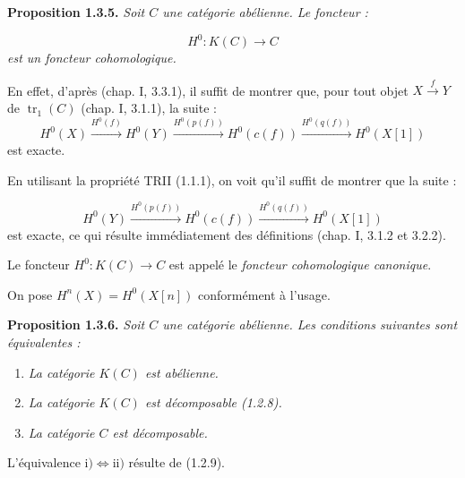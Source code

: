 \clearpage
{}%
\begingroup
\small
\setlength{\emergencystretch}{1.5em}%
\setlength{\abovedisplayskip}{4pt plus 2pt minus 2pt}%
\setlength{\belowdisplayskip}{4pt plus 2pt minus 2pt}%

\noindent\textbf{Proposition 1.3.5.}\quad
\emph{Soit $C$ une catégorie abélienne. Le foncteur :}

\[
  H^0\colon K(C)\longrightarrow C
\]
\noindent\emph{est un foncteur cohomologique.}

En effet, d'après (chap. I, 3.3.1), il suffit de montrer que, pour tout objet
$X\xrightarrow{f}Y$ de $\operatorname{tr}_1(C)$ (chap. I, 3.1.1), la suite :
\[
  H^0(X)\xrightarrow{H^0(f)}H^0(Y)
  \xrightarrow{H^0(p(f))}H^0(c(f))
  \xrightarrow{H^0(q(f))}H^0(X[1])
\]
\noindent est exacte.

En utilisant la propriété TRII (1.1.1), on voit qu'il suffit de montrer que
la suite :

\[
  H^0(Y)\xrightarrow{H^0(p(f))}H^0(c(f))
  \xrightarrow{H^0(q(f))}H^0(X[1])
\]
\noindent est exacte, ce qui résulte immédiatement des définitions
(chap. I, 3.1.2 et 3.2.2).

Le foncteur $H^0\colon K(C)\longrightarrow C$ est appelé le
\emph{foncteur cohomologique canonique}.

On pose $H^n(X)=H^0(X[n])$ conformément à l'usage.

\medskip
\noindent\textbf{Proposition 1.3.6.}\quad
\emph{Soit $C$ une catégorie abélienne. Les conditions suivantes sont
équivalentes :}

\begin{enumerate}
\renewcommand{\labelenumi}{\roman{enumi})}
\item \emph{La catégorie $K(C)$ est abélienne.}
\item \emph{La catégorie $K(C)$ est décomposable (1.2.8).}
\item \emph{La catégorie $C$ est décomposable.}
\end{enumerate}

L'équivalence
$\mathrm{i)}\Longleftrightarrow\mathrm{ii)}$ résulte de (1.2.9).

